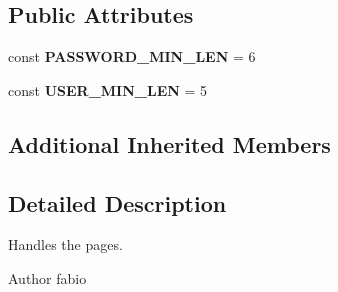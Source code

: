 \subsection*{Public Attributes}
\begin{DoxyCompactItemize}
\item 
\hypertarget{classBasePageController_a35247fc10b6367518b2232ea4d5ca90a}{const {\bfseries P\+A\+S\+S\+W\+O\+R\+D\+\_\+\+M\+I\+N\+\_\+\+L\+E\+N} = 6}\label{classBasePageController_a35247fc10b6367518b2232ea4d5ca90a}

\item 
\hypertarget{classBasePageController_acc0b220a790dddcd88a8ff7fd8fb88c9}{const {\bfseries U\+S\+E\+R\+\_\+\+M\+I\+N\+\_\+\+L\+E\+N} = 5}\label{classBasePageController_acc0b220a790dddcd88a8ff7fd8fb88c9}

\end{DoxyCompactItemize}
\subsection*{Additional Inherited Members}


\subsection{Detailed Description}
Handles the pages.

\begin{DoxyAuthor}{Author}
fabio 
\end{DoxyAuthor}


